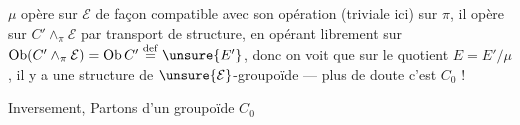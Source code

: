 $\mu$ opère sur $\mathcal E$ de façon compatible avec
son opération (triviale ici) sur $\pi$, il opère sur
$C'\mathbin{\wedge}_{\pi}\mathcal E$ par transport de structure, en opérant
librement sur $\operatorname{Ob}(C'\mathbin{\wedge}_{\pi}\mathcal E)=\operatorname{Ob}C'\overset{\mathrm{def}}{=}\unsure{E'}$, donc
on voit que sur le  quotient $E=E'/\mu$, il y
a une structure de $\unsure{\mathcal E}$-groupoïde ---
plus de doute c'est $C_0$ !

Inversement, Partons d'un groupoïde
$C_0$ 
